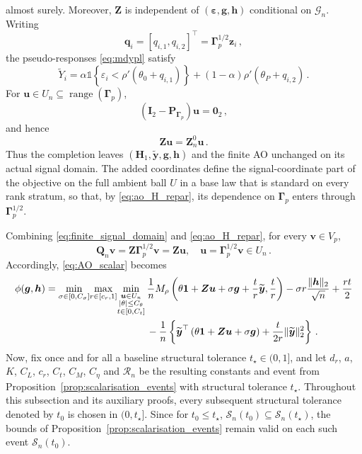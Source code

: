 \documentclass{article}
\makeatletter
\theoremstyle{definition}
\newcommand{\vnorm}[1]{%
	\ensuremath{%
		\if@display
		\left\| #1 \right\|
		\else
		\| #1 \|
		\fi
	}%
}
\newcommand{\abs}[1]{%
	\ensuremath{%
		\if@display
		\left| #1 \right|
		\else
		\lvert #1 \rvert
		\fi
	}%
}
\newcommand*{\bb}{\boldsymbol}
\def\bH {\bb{H}}
\def\bu{\bb{u}}
\def\bv{\bb{v}}
\def\bh{\bb{h}}
\def\bg{\bb{g}}
\def\Ytil{\widetilde{Y}}
\def\bYtil{\widetilde{\bb{y}}}
\def\bz{\bb{z}}
\def\bH{\bb{H}}
\newcommand{\range}{\operatorname{range}}
\makeatother
\begin{document}
\begin{bibunit}
almost surely. Moreover, $\bb Z$ is independent of
$(\bb\varepsilon,\bg,\bh)$ conditional on $\mathcal G_n$.
Writing
$$
    \bb q_i
    =
    [q_{i,1},q_{i,2}]^\top
    =
    \bb\Gamma_p^{1/2}\bz_i\,,
$$
the pseudo-responses \eqref{eq:mdypl} satisfy
$$
    \Ytil_i
    =
    \alpha\mathds{1}
    \left\{
        \varepsilon_i
        <
        \rho'(\theta_0+q_{i,1})
    \right\}
    +
    (1-\alpha)
    \rho'(\theta_P+q_{i,2})\,.
$$
For $\bu\in U_n\subseteq\range(\bb\Gamma_p)$,
$$
    \left(
        \bb I_2-\bb P_{\bb \Gamma_p}
    \right)
    \bu
    =
    \bb0_2\,,
$$
and hence
$$
    \bb Z\bu
    =
    \bb Z_n^0\bu\,.
$$
Thus the completion leaves
$(\bH_1,\bYtil,\bg,\bh)$ and the finite AO unchanged on its actual
signal domain. The added coordinates define the signal-coordinate part of
the objective on the full ambient ball $U$ in a base law that is standard
on every rank stratum, so that, by \eqref{eq:ao_H_repar}, its dependence on
$\bb\Gamma_p$ enters through $\bb\Gamma_p^{1/2}$.

Combining \eqref{eq:finite_signal_domain} and
\eqref{eq:ao_H_repar}, for every $\bv\in V_p$,
$$
    \bb Q_n\bv
    =
    \bb Z\bb\Gamma_p^{1/2}\bv
    =
    \bb Z\bu,
    \quad
    \bu
    =
    \bb\Gamma_p^{1/2}\bv
    \in
    U_n\,.
$$
Accordingly, \eqref{eq:AO_scalar} becomes
\begin{equation}
\label{eq:AO_scalar_u}
\begin{aligned}
    \phi(\bb g,\bb h)
    =
    \underset{\sigma\in[0,C_\sigma]}{\min}
    \underset{r\in[c_r,1]}{\max}
    \underset{
        \substack{
            \bu\in U_n\\
            \abs{\theta}\leq C_\theta\\
            t\in[0,C_t]
        }
    }{\min}
    \,
    &\frac1n
    M_\rho
    \left(
        \theta\bb1
        +
        \bb Z\bu
        +
        \sigma\bg
        +
        \frac tr\bYtil,
        \frac tr
    \right)
    -
    \sigma r
    \frac{\vnorm{\bh}_2}{\sqrt n}
    +
    \frac{rt}{2}
    \\
    &
    -
    \frac1n
    \left\{
        \bYtil^\top
        \left(
            \theta\bb1
            +
            \bb Z\bu
            +
            \sigma\bg
        \right)
        +
        \frac{t}{2r}
        \vnorm{\bYtil}_2^2
    \right\}\,.
\end{aligned}
\end{equation}
Now, fix once and for all a baseline structural tolerance
$t_\star\in(0,1]$, and let
$
	d_r$, 
    $
	a$, 
    $
	K$, 
    $
	C_L$, 
    $
	c_r$, 
    $
	C_t$, 
    $
	C_M$, 
    $
	C_\eta
$
and $\mathcal R_n$ be the resulting constants and event from
Proposition~\ref{prop:scalarisation_events} with structural tolerance
$t_\star$. Throughout this subsection and its auxiliary proofs, every
subsequent structural tolerance denoted by $t_0$ is chosen in
$(0,t_\star]$. Since for $t_0\leq t_\star$,
$
	\mathcal S_n(t_0)
	\subseteq
	\mathcal S_n(t_\star)
$, 
the bounds of Proposition~\ref{prop:scalarisation_events} remain valid
on each such event $\mathcal S_n(t_0)$.


\end{bibunit}
\end{document}
